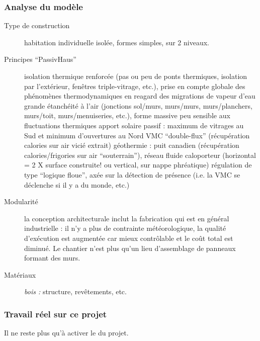 \documentclass[a4paper,12pt,french]{sphinxmanual}
\begin{document}
\subsubsection{Analyse du modèle}
\label{init_su+acad/001_intro:analyse-du-modele}\begin{description}
\item[{Type de construction}] \leavevmode
habitation individuelle isolée,
formes simples, sur 2 niveaux.

\item[{Principes ``PassivHaus''}] \leavevmode
isolation thermique renforcée (pas ou peu de ponts thermiques, isolation par l'extérieur, fenêtres triple-vitrage, etc.),
prise en compte globale des phénomènes thermodynamiques en reagard des migrations de vapeur d'eau
grande étanchéité à l'air (jonctions sol/murs, murs/murs, murs/planchers, murs/toit, murs/menuiseries, etc.),
forme massive peu sensible aux fluctuations thermiques
apport solaire passif : maximum de vitrages au Sud et minimum d'ouvertures au Nord
VMC ``double-flux'' (récupération calories sur air vicié extrait)
géothermie : puit canadien (récupération calories/frigories sur air ``souterrain''), réseau fluide caloporteur (horizontal = 2 X surface construite! ou vertical, sur nappe phréatique)
régulation de type ``logique floue'', axée sur la détection de présence (i.e. la VMC se déclenche si il y a du monde, etc.)

\item[{Modularité}] \leavevmode
la conception architecturale inclut la fabrication qui est en général industrielle : il n'y a plus de contrainte météorologique, la qualité d'exécution est augmentée car mieux contrôlable et le coût total est diminué.
Le chantier n'est plus qu'un lieu d'assemblage de panneaux formant des murs.

\item[{Matériaux}] \leavevmode
\emph{bois :} structure, revêtements, etc.

\end{description}


\subsubsection{Travail réel sur ce projet}
\label{init_su+acad/001_intro:travail-reel-sur-ce-projet}
Il ne reste plus qu'à activer le {\hyperref[init_su+acad/002_demarrage:demarrage\string-init\string-su\string-acad]{}} du projet.
\end{document}
